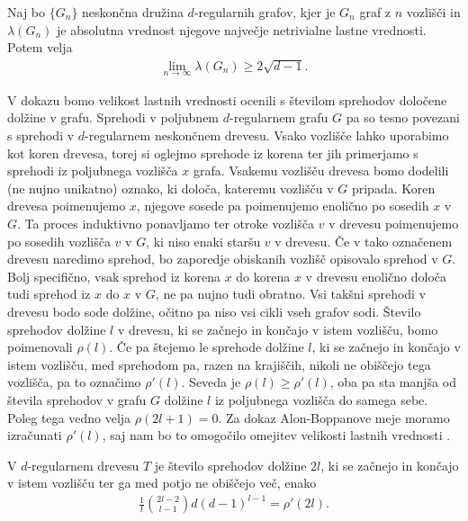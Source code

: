 \begin{izrek}
    \label{alon-boppanova-meja-izrek}
    Naj bo \(\{G_n\}\) neskončna družina \(d\)-regularnih grafov, kjer je \(G_n\) graf z \(n\) vozlišči in \(\lambda(G_n)\) je absolutna vrednost njegove največje netrivialne lastne vrednosti. Potem velja
    \begin{align*}
        \lim_{n\to\infty} \lambda(G_n) \geq 2\sqrt{d-1}.
    \end{align*}
\end{izrek}
V dokazu bomo velikost lastnih vrednosti ocenili s številom sprehodov določene dolžine v grafu. Sprehodi v poljubnem \(d\)-regularnem grafu \(G\) pa so tesno povezani s sprehodi v \(d\)-regularnem neskončnem drevesu. Vsako vozlišče lahko uporabimo kot koren drevesa, torej si oglejmo sprehode iz korena ter jih primerjamo s sprehodi iz poljubnega vozlišča \(x\) grafa. Vsakemu vozlišču drevesa bomo dodelili (ne nujno unikatno) oznako, ki določa, kateremu vozlišču v \(G\) pripada. Koren drevesa poimenujemo \(x\), njegove sosede pa poimenujemo enolično po sosedih \(x\) v \(G\). Ta proces induktivno ponavljamo ter otroke vozlišča \(v\) v drevesu poimenujemo po sosedih vozlišča \(v\) v \(G\), ki niso enaki staršu \(v\) v drevesu. Če v tako označenem drevesu naredimo sprehod, bo zaporedje obiskanih vozlišč opisovalo sprehod v \(G\). Bolj specifično, vsak sprehod iz korena \(x\) do korena \(x\) v drevesu enolično določa tudi sprehod iz \(x\) do \(x\) v \(G\), ne pa nujno tudi obratno. Vsi takšni sprehodi v drevesu bodo sode dolžine, očitno pa niso vsi cikli vseh grafov sodi. Število sprehodov dolžine \(l\) v drevesu, ki se začnejo in končajo v istem vozlišču, bomo poimenovali \(\rho(l)\). Če pa štejemo le sprehode dolžine \(l\), ki se začnejo in končajo v istem vozlišču, med sprehodom pa, razen na krajiščih, nikoli ne obiščejo tega vozlišča, pa to označimo \(\rho'(l)\). Seveda je \(\rho(l)\geq \rho'(l)\), oba pa sta manjša od števila sprehodov v grafu \(G\) dolžine \(l\) iz poljubnega vozlišča do samega sebe. Poleg tega vedno velja \(\rho(2l+1)=0\). Za dokaz Alon-Boppanove meje moramo izračunati \(\rho'(l)\), saj nam bo to omogočilo omejitev velikosti lastnih vrednosti \cite{polatajko}.
\begin{lema}\label{alon:drevesa-meja}
    V \(d\)-regularnem drevesu \(T\) je število sprehodov dolžine \(2l\), ki se začnejo in končajo v istem vozlišču ter ga med potjo ne obiščejo več, enako
    \begin{align*}
        \frac{1}{l}\binom{2l-2}{l-1}d(d-1)^{l-1} = \rho'(2l).
    \end{align*}
\end{lema}

